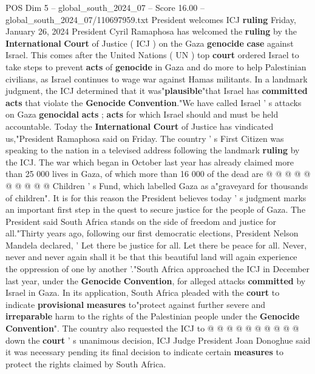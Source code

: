 \begin{textsample}{POS Dim 5 – global\_south\_2024\_07 – Score 16.00 – global\_south\_2024\_07/110697959.txt}  \label{ex:f5_pos_176}
President welcomes ICJ \textbf{ruling} Friday, January 26, 2024 President Cyril Ramaphosa has welcomed the \textbf{ruling} by the \textbf{International} \textbf{Court} of Justice ( ICJ ) on the Gaza \textbf{genocide} \textbf{case} against Israel.
This comes after the United Nations ( UN ) top \textbf{court} ordered Israel to take steps to prevent \textbf{acts} of \textbf{genocide} in Gaza and do more to help Palestinian civilians, as Israel continues to wage war against Hamas militants.
In a landmark judgment, the ICJ determined that it was"\textbf{plausible}"that Israel has \textbf{committed} \textbf{acts} that violate the \textbf{Genocide} \textbf{Convention}."We have called Israel ' s attacks on Gaza \textbf{genocidal} \textbf{acts} ; \textbf{acts} for which Israel should and must be held accountable.
Today the \textbf{International} \textbf{Court} of Justice has vindicated us,"President Ramaphosa said on Friday.
The country ' s First Citizen was speaking to the nation in a televised address following the landmark \textbf{ruling} by the ICJ.
The war which began in October last year has already claimed more than 25 000 lives in Gaza, of which more than 16 000 of the dead are @ @ @ @ @ @ @ @ @ @ Children ' s Fund, which labelled Gaza as a"graveyard for thousands of children".
It is for this reason the President believes today ' s judgment marks an important first step in the quest to secure justice for the people of Gaza.
The President said South Africa stands on the side of freedom and justice for all."Thirty years ago, following our first democratic elections, President Nelson Mandela declared, ' Let there be justice for all.
Let there be peace for all.
Never, never and never again shall it be that this beautiful land will again experience the oppression of one by another '."South Africa approached the ICJ in December last year, under the \textbf{Genocide} \textbf{Convention}, for alleged attacks \textbf{committed} by Israel in Gaza.
In its application, South Africa pleaded with the \textbf{court} to indicate \textbf{provisional} \textbf{measures} to"protect against further severe and \textbf{irreparable} harm to the rights of the Palestinian people under the \textbf{Genocide} \textbf{Convention}".
The country also requested the ICJ to @ @ @ @ @ @ @ @ @ @ down the \textbf{court} ' s unanimous decision, ICJ Judge President Joan Donoghue said it was necessary pending its final decision to indicate certain \textbf{measures} to protect the rights claimed by South Africa.

\end{textsample}
